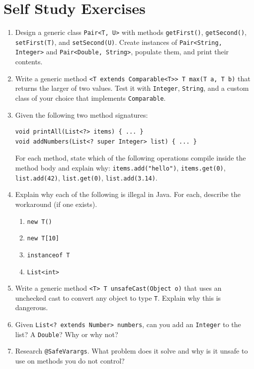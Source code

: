 \documentclass[twoside=false,DIV=14]{scrartcl}
\begin{document}
\section*{Self Study Exercises}
\begin{enumerate}
\item Design a generic class \texttt{Pair<T, U>} with methods \texttt{getFirst()}, \texttt{getSecond()}, \texttt{setFirst(T)}, and \texttt{setSecond(U)}.  Create instances of \texttt{Pair<String, Integer>} and \texttt{Pair<Double, String>}, populate them, and print their contents.
\item Write a generic method \texttt{<T extends Comparable<T>{}> T max(T a, T b)} that returns the larger of two values.  Test it with \texttt{Integer}, \texttt{String}, and a custom class of your choice that implements \texttt{Comparable}.
\item Given the following two method signatures:
\begin{lstlisting}
void printAll(List<?> items) { ... }
void addNumbers(List<? super Integer> list) { ... }
\end{lstlisting}
For each method, state which of the following operations compile inside the method body and explain why: \texttt{items.add("hello")}, \texttt{items.get(0)}, \texttt{list.add(42)}, \texttt{list.get(0)}, \texttt{list.add(3.14)}.
\item Explain why each of the following is illegal in Java.  For each, describe the workaround (if one exists).
\begin{enumerate}
    \item \texttt{new T()}
    \item \texttt{new T[10]}
    \item \texttt{instanceof T}
    \item \texttt{List<int>}
\end{enumerate}
\item Write a generic method \texttt{<T> T unsafeCast(Object o)} that uses an unchecked cast to convert any object to type \texttt{T}.  Explain why this is dangerous.
\item Given \texttt{List<? extends Number> numbers}, can you add an \texttt{Integer} to the list?  A \texttt{Double}?  Why or why not?
\item Research \texttt{@SafeVarargs}.  What problem does it solve and why is it unsafe to use on methods you do not control?
\end{enumerate}
\end{document}
